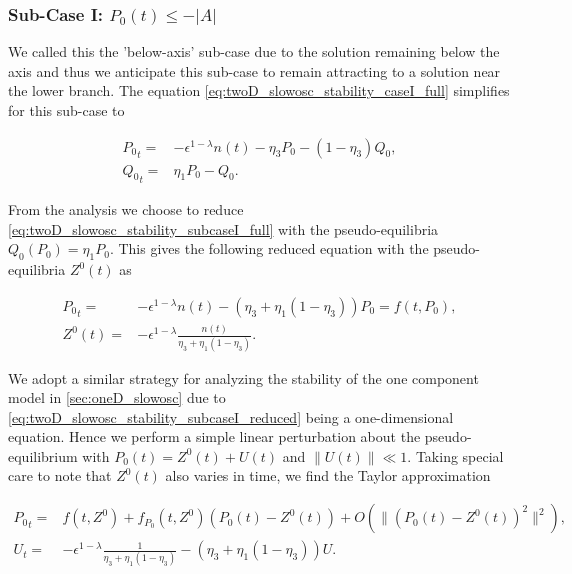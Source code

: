 \subsubsection{Sub-Case I: $P_0(t)\le-|A|$}

We called this the 'below-axis' sub-case due to the solution remaining below the axis and thus we anticipate this sub-case to remain attracting to a solution near the lower branch. The equation \eqref{eq:twoD_slowosc_stability_caseI_full} simplifies for this sub-case to

\begin{equation}\label{eq:twoD_slowosc_stability_subcaseI_full}
\begin{aligned}
{P_0}_t =& -\epsilon^{1-\lambda} n(t)-\eta_3 P_0 -(1-\eta_3)Q_0,\\
{Q_0}_t =& \eta_1 P_0 - Q_0.
\end{aligned}
\end{equation}

From the analysis we choose to reduce \eqref{eq:twoD_slowosc_stability_subcaseI_full} with the pseudo-equilibria $Q_0(P_0)=\eta_1 P_0$. This gives the following reduced equation with the pseudo-equilibria $Z^0(t)$ as 

\begin{equation}\label{eq:twoD_slowosc_stability_subcaseI_reduced}
\begin{aligned}
{P_0}_t =& -\epsilon^{1-\lambda}n(t)-(\eta_3+\eta_1(1-\eta_3))P_0=f(t,P_0),\\ Z^0(t) =& -\epsilon^{1-\lambda}\frac{n(t)}{\eta_3+\eta_1(1-\eta_3)}.
\end{aligned}
\end{equation}

\indent We adopt a similar strategy for analyzing the stability of the one component model in \autoref{sec:oneD_slowosc} due to \eqref{eq:twoD_slowosc_stability_subcaseI_reduced} being a one-dimensional equation. Hence we perform a simple linear perturbation about the pseudo-equilibrium with $P_0(t)=Z^0(t)+U(t)$ and $\lVert U(t)\rVert \ll 1$. Taking special care to note that $Z^0(t)$ also varies in time, we find the Taylor approximation

\begin{equation}\label{eq:twoD_slowosc_subcaseI_perturb}
\begin{aligned}
{P_0}_t=&f(t,Z^0) +f_{P_0}(t,Z^0)(P_0(t)-Z^0(t))+O(\lVert (P_0(t)-Z^0(t))^2\rVert^2),\\
U_t =& -\epsilon^{1-\lambda}\frac{1}{\eta_3+\eta_1(1-\eta_3)}-(\eta_3+\eta_1(1-\eta_3))U.
\end{aligned}
\end{equation}

